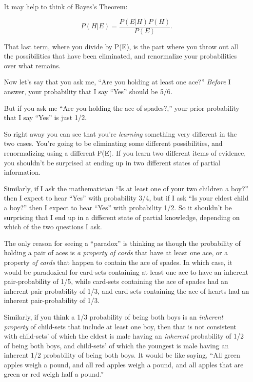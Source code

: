 {
 It may help to think of Bayes's Theorem:}

\begin{equation*}
  P(H|E) = \frac{P(E|H)P(H)}{P(E)}.
\end{equation*}


\bigskip

{
 That last term, where you divide by P(E), is the part where you
throw out all the possibilities that have been eliminated, and
renormalize your probabilities over what remains. }

{
 Now let's say that you ask me,
``Are you holding at least one
ace?'' \textit{Before} I answer, your probability
that I say ``Yes'' should be 5/6.}

{
 But if you ask me ``Are you holding the ace of
spades?,'' your prior probability that I say
``Yes'' is just 1/2.}

{
 So right away you can see that you're
\textit{learning} something very different in the two cases.
You're going to be eliminating some different
possibilities, and renormalizing using a different P(E). If you learn
two different items of evidence, you shouldn't be
surprised at ending up in two different states of partial information.}

{
 Similarly, if I ask the mathematician ``Is at
least one of your two children a boy?'' then I expect
to hear ``Yes'' with probability
3/4, but if I ask ``Is your eldest child a
boy?'' then I expect to hear
``Yes'' with probability 1/2. So it
shouldn't be surprising that I end up in a different
state of partial knowledge, depending on which of the two questions I
ask.}

{
 The only reason for seeing a
``paradox'' is thinking as though
the probability of holding a pair of aces is \textit{a property of
cards} that have at least one ace, or a property \textit{of cards} that
happen to contain the ace of spades. In which case, it would be
paradoxical for card-sets containing at least one ace to have an
inherent pair-probability of 1/5, while card-sets containing the ace of
spades had an inherent pair-probability of 1/3, and card-sets
containing the ace of hearts had an inherent pair-probability of 1/3.}

{
 Similarly, if you think a 1/3 probability of being both boys is an
\textit{inherent property} of child-sets that include at least one boy,
then that is not consistent with child-sets' of which
the eldest is male having an \textit{inherent} probability of 1/2 of
being both boys, and child-sets' of which the youngest
is male having an inherent 1/2 probability of being both boys. It would
be like saying, ``All green apples weigh a pound, and
all red apples weigh a pound, and all apples that are green or red
weigh half a pound.''}

